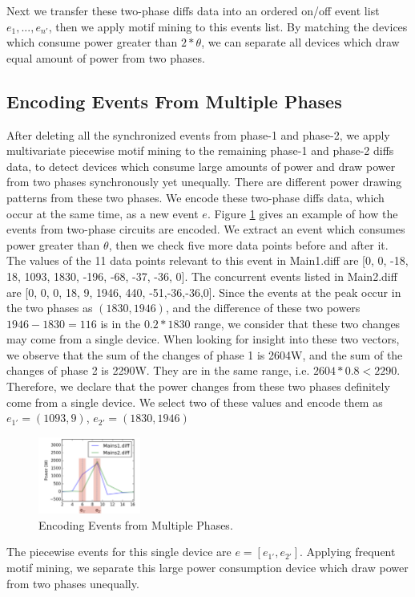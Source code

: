 Next we transfer these two-phase diffs data into 
an ordered on/off event list $e_1, ..., e_{n'}$,
then we apply motif mining to this events list. 
By matching the devices which consume power greater than $2*\theta$, 
we can separate all devices which draw equal amount of power from two phases.  

\subsection{Encoding Events From Multiple Phases}
After deleting all the synchronized events from phase-1 and phase-2, 
we apply multivariate piecewise motif mining to the remaining phase-1 and phase-2 diffs data, 
to detect devices which consume large amounts of power 
and draw power from two phases synchronously yet unequally. 
There are different power drawing patterns from these two phases.  
We encode these two-phase diffs data, which occur at the same time, as a new event $e$. 
Figure \ref{fig_eventEncoding} gives an example of how the events from two-phase circuits
are encoded. 
We extract an event which consumes power greater than $\theta$, 
then we check five more data points before and after it. 
The values of the 11 data points relevant to this event in Main1.diff are [0, 0, -18, 18, 1093, 1830, -196, -68, -37, -36, 0]. 
The concurrent events listed in Main2.diff are [0, 0, 0, 18, 9, 1946, 440, -51,-36,-36,0]. 
Since the events at the peak occur in the two phases as $(1830, 1946)$, 
and the difference of these two powers $1946-1830=116$ is in the $0.2*1830$ range, 
we consider that these two changes may come from a single device. 
When looking for insight into these two vectors, 
we observe that the sum of the changes of phase 1 is 2604W, and the sum of the changes of phase 2 is 2290W. 
They are in the same range, i.e. $2604*0.8 < 2290$. 
Therefore, we declare that the power changes from these two phases definitely come from a single device. 
We select two of these values and encode them as $e_{1'}=(1093, 9)$, $e_{2'}= (1830, 1946)$
\begin{figure}[h]
\centering
\includegraphics[width=0.3\textwidth]{multidisaggfig/synchronizeDifferentEventEncoding.pdf}
\caption{Encoding Events from Multiple Phases.}
\label{fig_eventEncoding}
\end{figure}

The piecewise events for this single device are $e= [e_{1'}, e_{2'}]$. 
Applying frequent motif mining, 
we separate this large power consumption device which draw power from two phases unequally. 



